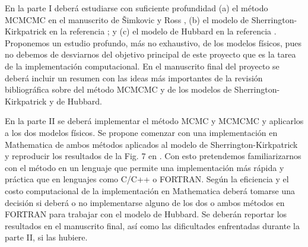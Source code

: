 \documentclass[letterpaper,superscriptaddress,aps,pra,nolongbibliography,twocolumn,showpacs,floatfix,10pt]{revtex4-2} %
\renewcommand{\>}{\rangle}
\newcommand{\<}{\langle}
\newcommand{\syr}{Šimkovic y Ross}
\begin{document}
En la parte I deberá estudiarse con suficiente profundidad (a) el
método MCMCMC en el manuscrito de \syr{} \cite{simkovic2021manyconfiguration},
(b) el modelo de Sherrington-Kirkpatrick en la referencia \cite{panchenko2012sherrington};
y (c) el modelo de Hubbard en la referencia \cite{hirsch1985two}. Proponemos un estudio
profundo, más no exhaustivo, de los modelos físicos, pues no debemos de 
desviarnos del objetivo principal de este proyecto que es la tarea de la 
implementación computacional. En el manuscrito final del proyecto se deberá
incluir un resumen con las ideas más importantes de la revisión bibliográfica
sobre del método MCMCMC y de los modelos de Sherrington-Kirkpatrick y de Hubbard.

En la parte II se deberá implementar el método MCMC y MCMCMC y aplicarlos
a los dos modelos físicos. Se propone comenzar con una implementación en 
Mathematica de ambos métodos aplicados al modelo de Sherrington-Kirkpatrick
y reproducir los resultados de la Fig. 7 en \cite{simkovic2021manyconfiguration}.
Con esto pretendemos familiarizarnos con el método en un lenguaje que 
permite una implementación más rápida y práctica que en lenguajes como C/C++
o FORTRAN. Según la eficiencia y el costo computacional de la implementación
en Mathematica deberá tomarse una decisión si deberá o no implementarse
alguno de los dos o ambos métodos en FORTRAN para trabajar con el modelo 
de Hubbard. Se deberán reportar los resultados en el manuscrito final, así 
como las dificultades enfrentadas durante la parte II, si las hubiere. 
\end{document}
